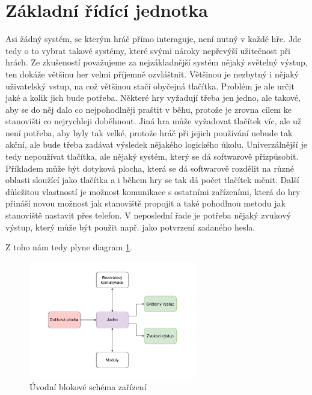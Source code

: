 \section{Základní řídící jednotka}
Asi žádný systém, se kterým hráč přímo interaguje, není nutný v každé hře.
Jde tedy o to vybrat takové systémy, které svými nároky nepřevýší užitečnost při hrách.
Ze zkušeností považujeme za nejzákladnější systém nějaký světelný výstup, ten dokáže většinu her velmi příjemně ozvláštnit.
Většinou je nezbytný i nějaký uživatelský vstup, na což většinou stačí obyčejná tlačítka.
Problém je ale určit jaké a kolik jich bude potřeba.
Některé hry vyžadují třeba jen jedno, ale takové, aby se do něj dalo co nejpohodlněji praštit v běhu, protože je zrovna cílem ke stanovišti co nejrychleji doběhnout.
Jiná hra může vyžadovat tlačítek víc, ale už není potřeba, aby byly tak velké, protože hráč při jejich používání nebude tak akční, ale bude třeba zadávat výsledek nějakého logického úkolu.
Univerzálnější je tedy nepoužívat tlačítka, ale nějaký systém, který se dá softwarově přizpůsobit.
Příkladem může být dotyková plocha, která se dá softwarově rozdělit na různé oblasti sloužící jako tlačítka a i během hry se tak dá počet tlačítek měnit.
Další důležitou vlastností je možnost komunikace s ostatními zařízeními, která do hry přináší novou možnost jak stanoviště propojit a také pohodlnou metodu jak stanoviště nastavit přes telefon.
V neposlední řade je potřeba nějaký zvukový výstup, který může být použit např. jako potvrzení zadaného hesla.

Z toho nám tedy plyne diagram \ref{fig:diagram_zanoreni_0}.
\begin{figure}[h]
    \centering
    \includegraphics[width=0.65\textwidth]{text/TeoretickyUvod/AplikaceHernichZarizeni/diagram/zanoreni_0.pdf}
    \caption{Úvodní blokové schéma zařízení}
    \label{fig:diagram_zanoreni_0}
\end{figure}

